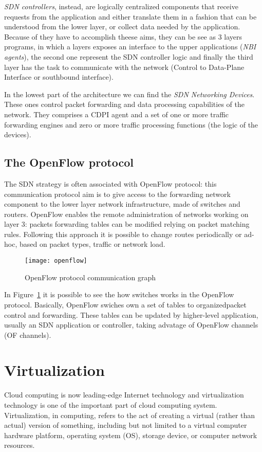 \emph{SDN controllers}, instead, are logically centralized components that
receive requests from the application and either translate them in a fashion
that can be understood from the lower layer, or collect data needed by the
application. Because of they have to accomplish theese aims, they can be see
as 3 layers programs, in which a layers exposes an interface to the upper
applications (\emph{NBI agents}), the second one represent the SDN controller
logic and finally the third layer has the task to communicate with the network
(Control to Data-Plane Interface or southbound interface).

In the lowest part of the architecture we can find the \emph{SDN Networking 
Devices}. These ones control packet forwarding and data processing capabilities 
of the network. They comprises a CDPI agent and a set of one or more traffic 
forwarding engines and zero or more traffic processing functions (the logic of 
the devices).

\subsection{The OpenFlow protocol}
The SDN strategy is often associated with OpenFlow protocol: this communication
protocol aim is to give access to the forwarding network component to the lower
layer network infrastructure, made of switches and routers. OpenFlow enables
the remote administration of networks working on layer 3: packets forwarding
tables can be modified relying on packet matching rules. Following this
approach it is possible to change routes periodically or ad-hoc, based on
packet types, traffic or network load.

\begin{figure}[t]
 \centering
 \texttt{[image: openflow]}
 \caption{OpenFlow protocol communication graph}
 \label{chap:background:img:openflow_protocol}
\end{figure}

In Figure~\ref{chap:background:img:openflow_protocol} it is possible to see the
how switches works in the OpenFlow protocol. Basically, OpenFlow swiches own a
set of tables to organizedpacket control and forwarding. These tables can be
updated by higher-level application, usually an SDN application or controller,
taking advatage of OpenFlow channels (OF channels). 

\section{Virtualization}
Cloud computing is now leading-edge Internet technology and virtualization
technology is one of the important part of cloud computing system.
Virtualization, in computing, refers to the act of creating a virtual (rather
than actual) version of something, including but not limited to a virtual
computer hardware platform, operating system (OS), storage device, or computer
network resources. 

